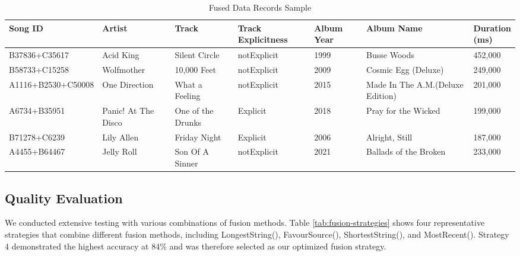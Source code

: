 \documentclass[runningheads]{llncs}
\begin{document}
\begin{table}[h!]
	\footnotesize  
	\centering     
	\renewcommand{\arraystretch}{1.3}
	\caption{Fused Data Records Sample}
	\label{tab:fused-data-samples}
	\begin{tabular}{p{2.4cm}p{1.8cm}p{2cm}p{1.5cm}p{1cm}p{2.8cm}p{1.2cm}}
	\toprule
	\textbf{\centering Song ID} & \textbf{\centering Artist} & \textbf{\centering Track} & \textbf{\centering Track Ex\-plicit\-ness} & \textbf{\centering Album Year} & \textbf{\centering Album Name} & \textbf{\centering Duration\\(ms)} \\[-0.3em]
	\midrule
	B37836+C35617 & Acid King & Silent Circle & notExplicit & 1999 & Busse Woods & 452,000 \\
	\cmidrule{1-7}
	B58733+C15258 & Wolf\-mother & 10,000 Feet & notExplicit & 2009 & Cosmic Egg (Deluxe) & 249,000 \\
	\cmidrule{1-7}
	A1116+B2530+\newline C50008 & One Direc\-tion & What a Feel\-ing & notExplicit & 2015 & Made In The A.M.\newline(Deluxe Edition) & 201,000 \\
	\cmidrule{1-7}
	A6734+B35951 & Panic! At The Disco & One of the Drunks & Explicit & 2018 & Pray for the Wicked & 199,000 \\
	\cmidrule{1-7}
	B71278+C6239 & Lily Allen & Friday Night & Explicit & 2006 & Alright, Still & 187,000 \\
	\cmidrule{1-7}
	A4455+B64467 & Jelly Roll & Son Of A Sin\-ner & notExplicit & 2021 & Ballads of the Bro\-ken & 233,000 \\
	\bottomrule
	\end{tabular}
	\end{table}

\subsection{Quality Evaluation}
We conducted extensive testing with various combinations of fusion methods. Table \ref{tab:fusion-strategies} shows four representative strategies that combine different fusion methods, including LongestString(), FavourSource(), ShortestString(), and MostRecent(). Strategy 4 demonstrated the highest accuracy at 84\% and was therefore selected as our optimized fusion strategy.
\end{document}
